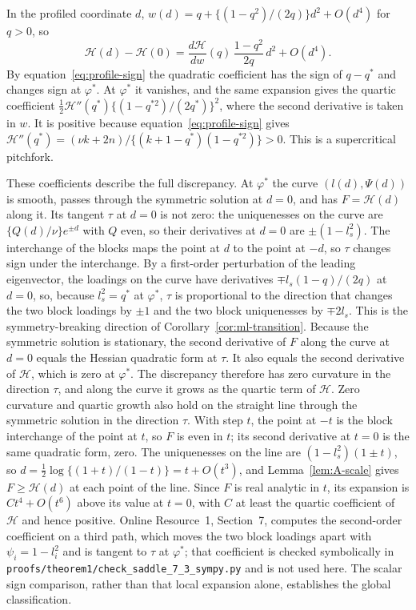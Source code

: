 In the profiled coordinate $d$, $w(d)=q+\{(1-q^2)/(2q)\}d^2+O(d^4)$ for $q>0$, so
\[
\mathcal H(d)-\mathcal H(0)=\frac{d\mathcal H}{dw}(q)\,\frac{1-q^2}{2q}\,d^2+O(d^4).
\]
By equation~\eqref{eq:profile-sign} the quadratic coefficient has the sign of $q-q^*$ and changes sign at $\varphi^*$. At $\varphi^*$ it vanishes, and the same expansion gives the quartic coefficient $\tfrac12\mathcal H''(q^*)\{(1-q^{*2})/(2q^*)\}^2$, where the second derivative is taken in $w$. It is positive because equation~\eqref{eq:profile-sign} gives $\mathcal H''(q^*)=(\nu k+2n)/\{(k+1-q^*)(1-q^{*2})\}>0$. This is a supercritical pitchfork.

These coefficients describe the full discrepancy. At $\varphi^*$ the curve $(l(d),\Psi(d))$ is smooth, passes through the symmetric solution at $d=0$, and has $F=\mathcal H(d)$ along it. Its tangent $\tau$ at $d=0$ is not zero: the uniquenesses on the curve are $\{Q(d)/\nu\}e^{\pm d}$ with $Q$ even, so their derivatives at $d=0$ are $\pm(1-l_s^2)$. The interchange of the blocks maps the point at $d$ to the point at $-d$, so $\tau$ changes sign under the interchange. By a first-order perturbation of the leading eigenvector, the loadings on the curve have derivatives $\mp l_s(1-q)/(2q)$ at $d=0$, so, because $l_s^2=q^*$ at $\varphi^*$, $\tau$ is proportional to the direction that changes the two block loadings by $\pm1$ and the two block uniquenesses by $\mp2l_s$. This is the symmetry-breaking direction of Corollary~\ref{cor:ml-transition}. Because the symmetric solution is stationary, the second derivative of $F$ along the curve at $d=0$ equals the Hessian quadratic form at $\tau$. It also equals the second derivative of $\mathcal H$, which is zero at $\varphi^*$. The discrepancy therefore has zero curvature in the direction $\tau$, and along the curve it grows as the quartic term of $\mathcal H$. Zero curvature and quartic growth also hold on the straight line through the symmetric solution in the direction $\tau$. With step $t$, the point at $-t$ is the block interchange of the point at $t$, so $F$ is even in $t$; its second derivative at $t=0$ is the same quadratic form, zero. The uniquenesses on the line are $(1-l_s^2)(1\pm t)$, so $d=\tfrac12\log\{(1+t)/(1-t)\}=t+O(t^3)$, and Lemma~\ref{lem:A-scale} gives $F\ge\mathcal H(d)$ at each point of the line. Since $F$ is real analytic in $t$, its expansion is $Ct^4+O(t^6)$ above its value at $t=0$, with $C$ at least the quartic coefficient of $\mathcal H$ and hence positive. Online Resource~1, Section~7, computes the second-order coefficient on a third path, which moves the two block loadings apart with $\psi_i=1-l_i^2$ and is tangent to $\tau$ at $\varphi^*$; that coefficient is checked symbolically in \texttt{proofs/theorem1/check\_saddle\_7\_3\_sympy.py} and is not used here. The scalar sign comparison, rather than that local expansion alone, establishes the global classification.

